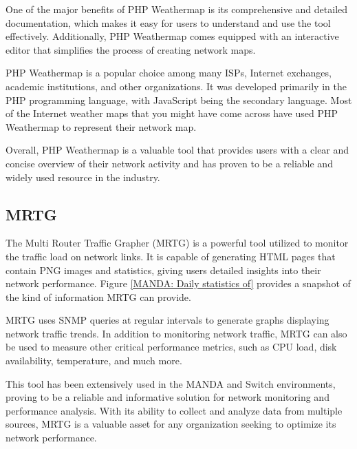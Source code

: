 \documentclass[sigconf,authorversion,nonacm]{acmart}
\begin{document}
One of the major benefits of PHP Weathermap is its comprehensive and detailed documentation, which makes it easy for users to understand and use the tool effectively. Additionally, PHP Weathermap comes equipped with an interactive editor that simplifies the process of creating network maps. 

PHP Weathermap is a popular choice among many ISPs, Internet exchanges, academic institutions, and other organizations. It was developed primarily in the PHP programming language, with JavaScript being the secondary language. Most of the Internet weather maps that you might have come across have used PHP Weathermap to represent their network map. 

Overall, PHP Weathermap is a valuable tool that provides users with a clear and concise overview of their network activity and has proven to be a reliable and widely used resource in the industry.

\subsection{MRTG}\label{MRTG}
The Multi Router Traffic Grapher (MRTG) is a powerful tool utilized to monitor the traffic load on network links. It is capable of generating HTML pages that contain PNG images and statistics, giving users detailed insights into their network performance. Figure \ref{MANDA: Daily statistics of} provides a snapshot of the kind of information MRTG can provide. 

MRTG uses SNMP queries at regular intervals to generate graphs displaying network traffic trends. In addition to monitoring network traffic, MRTG can also be used to measure other critical performance metrics, such as CPU load, disk availability, temperature, and much more. 

This tool has been extensively used in the MANDA and Switch environments, proving to be a reliable and informative solution for network monitoring and performance analysis. With its ability to collect and analyze data from multiple sources, MRTG is a valuable asset for any organization seeking to optimize its network performance.
\end{document}
